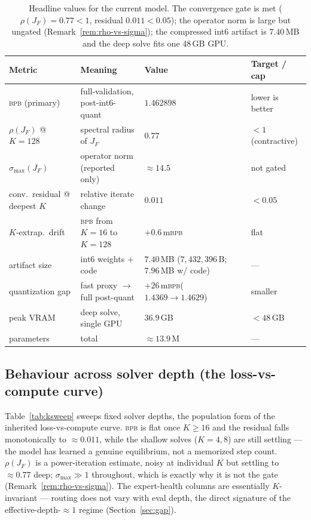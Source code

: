 \documentclass[11pt]{article}
\newcommand{\rhoF}{\rho(J_F)}
\newcommand{\bpb}{\textsc{bpb}}
\begin{document}
\begin{table}[H]
\centering
\footnotesize
\renewcommand{\arraystretch}{1.2}
\begin{tabular}{@{}L{0.185\textwidth} L{0.30\textwidth} L{0.235\textwidth} L{0.155\textwidth}@{}}
\toprule
\textbf{Metric} & \textbf{Meaning} & \textbf{Value} & \textbf{Target / cap} \\
\midrule
\bpb{} (primary) & full-validation, post-int6-quant & $\mathbf{1.462898}$ & lower is better \\
$\rhoF$ @ $K{=}128$ & spectral radius of $J_F$ & $0.77$ & $<1$ (contractive) \\
$\sigma_{\max}(J_F)$ & operator norm (reported only) & $\approx14.5$ & not gated \\
conv.\ residual @ deepest $K$ & relative iterate change & $0.011$ & $<0.05$ \\
$K$-extrap.\ drift & \bpb{} from $K{=}16$ to $K{=}128$ & $+0.6$\,m\bpb & flat \\
artifact size & int6 weights $+$ code & $7.40$\,MB ($7{,}432{,}396$\,B; $7.96$\,MB w/ code) & --- \\
quantization gap & fast proxy $\to$ full post-quant & $+26$\,m\bpb ($1.4369\!\to\!1.4629$) & smaller \\
peak VRAM & deep solve, single GPU & $36.9$\,GB & $<48$\,GB \\
parameters & total & $\approx13.9$\,M & --- \\
\bottomrule
\end{tabular}
\caption{Headline values for the current model.  The convergence gate is met ($\rhoF=0.77<1$,
residual $0.011<0.05$); the operator norm is large but ungated (Remark~\ref{rem:rho-vs-sigma}); the
compressed int6 artifact is $7.40$\,MB and the deep solve fits one 48\,GB GPU.}
\label{tab:headline}
\end{table}

\subsection{Behaviour across solver depth (the loss-vs-compute curve)}
\label{sec:ksweep}

Table~\ref{tab:ksweep} sweeps fixed solver depths, the population form of the inherited
loss-vs-compute curve.  \bpb{} is flat once $K\ge16$ and the residual falls monotonically to
$\approx0.011$, while the shallow solves ($K=4,8$) are still settling --- the model has learned a
genuine equilibrium, not a memorized step count.  $\rhoF$ is a power-iteration estimate, noisy at
individual $K$ but settling to $\approx0.77$ deep; $\sigma_{\max}\gg1$ throughout, which is exactly
why it is not the gate (Remark~\ref{rem:rho-vs-sigma}).  The expert-health columns are essentially
$K$-invariant --- routing does not vary with eval depth, the direct signature of the
effective-depth-$\approx1$ regime (Section~\ref{sec:gap}).
\end{document}
